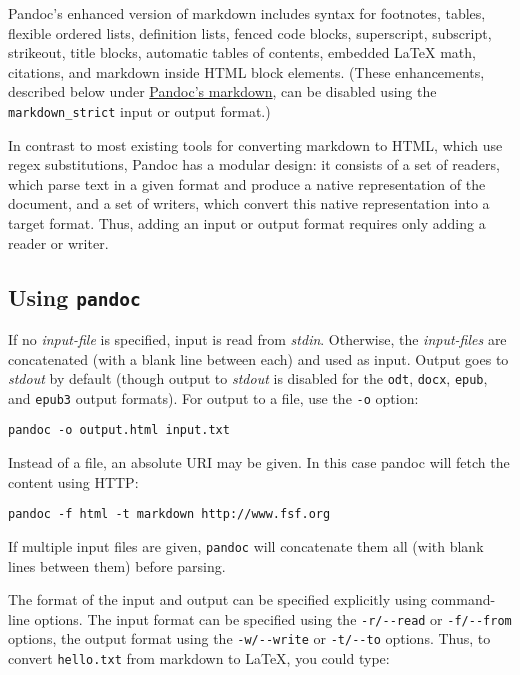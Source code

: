 \documentclass[]{article}
\begin{document}
Pandoc's enhanced version of markdown includes syntax for footnotes,
tables, flexible ordered lists, definition lists, fenced code blocks,
superscript, subscript, strikeout, title blocks, automatic tables of
contents, embedded LaTeX math, citations, and markdown inside HTML block
elements. (These enhancements, described below under
\hyperref[pandocs-markdown]{Pandoc's markdown}, can be disabled using
the \texttt{markdown\_strict} input or output format.)

In contrast to most existing tools for converting markdown to HTML,
which use regex substitutions, Pandoc has a modular design: it consists
of a set of readers, which parse text in a given format and produce a
native representation of the document, and a set of writers, which
convert this native representation into a target format. Thus, adding an
input or output format requires only adding a reader or writer.

\subsection{Using \texttt{pandoc}}

If no \emph{input-file} is specified, input is read from \emph{stdin}.
Otherwise, the \emph{input-files} are concatenated (with a blank line
between each) and used as input. Output goes to \emph{stdout} by default
(though output to \emph{stdout} is disabled for the \texttt{odt},
\texttt{docx}, \texttt{epub}, and \texttt{epub3} output formats). For
output to a file, use the \texttt{-o} option:

\begin{verbatim}
pandoc -o output.html input.txt
\end{verbatim}

Instead of a file, an absolute URI may be given. In this case pandoc
will fetch the content using HTTP:

\begin{verbatim}
pandoc -f html -t markdown http://www.fsf.org
\end{verbatim}

If multiple input files are given, \texttt{pandoc} will concatenate them
all (with blank lines between them) before parsing.

The format of the input and output can be specified explicitly using
command-line options. The input format can be specified using the
\texttt{-r/-{}-read} or \texttt{-f/-{}-from} options, the output format
using the \texttt{-w/-{}-write} or \texttt{-t/-{}-to} options. Thus, to
convert \texttt{hello.txt} from markdown to LaTeX, you could type:
\end{document}
